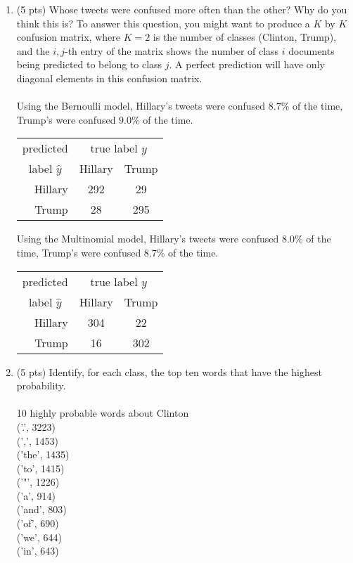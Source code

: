 \documentclass[]{article}
\begin{document}
\begin{enumerate}
	\item (5 pts) Whose tweets were confused more often than the other? Why do you think this is? To answer this question, you might want to produce a $K$ by $K$ confusion matrix, where $K = 2$ is the number of classes (Clinton, Trump), and the $i, j$-th entry of the matrix shows the number of class $i$ documents being predicted to belong to class $j$. A perfect prediction will have only diagonal elements in this confusion matrix.\\
	\\
	 Using the Bernoulli model,  Hillary's tweets were confused $8.7\%$ of the time, Trump's were confused $9.0\%$ of the time.
	 \begin{center}
	 	\begin{tabular}{|r|c|c|}\hline
	 		\multicolumn{1}{|c|}{predicted} & \multicolumn{2}{c|}{true label $y$}\\ \cline{2-3}
	 		\multicolumn{1}{|c|}{label $\hat{y}$} & Hillary & Trump \\ \hline
	 		Hillary   & 292 & 29 \\ \hline
	 		Trump     & 28 &  295 \\ \hline 
	 	\end{tabular} 
	 \end{center}
	
	 Using the Multinomial model,  Hillary's tweets were confused $8.0\%$ of the time, Trump's were confused $8.7\%$ of the time.
	 \begin{center}
		 	\begin{tabular}{|r|c|c|}\hline
		 		\multicolumn{1}{|c|}{predicted} & \multicolumn{2}{c|}{true label $y$}\\ \cline{2-3}
		 		\multicolumn{1}{|c|}{label $\hat{y}$} & Hillary & Trump \\ \hline
		 		Hillary   & 304 & 22 \\ \hline
		 		Trump     & 16 &  302 \\ \hline  	 		
		 	\end{tabular}
	 \end{center}
	 
	 \item (5 pts)  Identify, for each class, the top ten words that have the highest probability.\\
	 \\
		 10 highly probable words about Clinton\\
		 ('.', 3223)\\
		 (',', 1453)\\
		 ('the', 1435)\\
		 ('to', 1415)\\
		 ('"', 1226)\\
		 ('a', 914)\\
		 ('and', 803)\\
		 ('of', 690)\\
		 ('we', 644)\\
		 ('in', 643)\\ 
		 

\end{enumerate}
\end{document}
